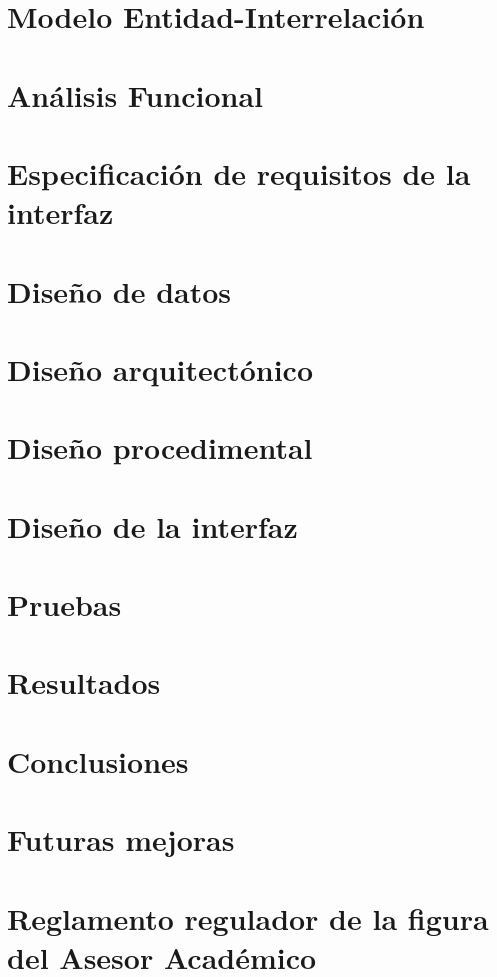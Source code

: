 \documentclass[a4paper,12pt]{book}
\begin{document}
   \chapter{Modelo Entidad-Interrelación}\label{modEntInt}
      
      
      
      

   \chapter{Análisis Funcional}

   \chapter{Especificación de requisitos de la interfaz}\label{espReqInt}

   \chapter{Diseño de datos}
      
      
      

   \chapter{Diseño arquitectónico}

   \chapter{Diseño procedimental}

   \chapter{Diseño de la interfaz}

   \chapter{Pruebas}\label{pruebas}

   \chapter{Resultados}

   \chapter{Conclusiones}

   \chapter{Futuras mejoras}

   \listoffigures

   

   \appendix
   \chapter{Reglamento regulador de la figura del Asesor Académico}\label{a1}
   
\end{document}
